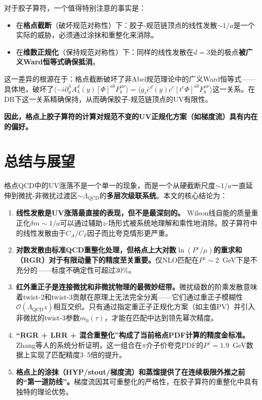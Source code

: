 \documentclass[12pt,a4paper]{ctexart}
\theoremstyle{definition}
\begin{document}
对于胶子算符，一个值得特别注意的事实是\cite{Li2018multiplicative}：

\begin{itemize}
    \item 在\textbf{格点截断}（破坏规范对称性）下：胶子-规范链顶点的线性发散$\sim 1/a$是一个实际的威胁，必须通过涂抹和重整化来消除。
    \item 在\textbf{维数正规化}（保持规范对称性）下：同样的线性发散在$d=3$处的极点\textbf{被广义Ward恒等式确保抵消}。
\end{itemize}

这一差异的根源在于：格点截断破坏了非Abel规范理论中的广义Ward恒等式——具体地，破坏了$\langle -i\partial_y^\lambda A_\lambda^d(y) [\Phi]^{ab} F^{\mu\nu}_b \rangle = \langle g_s \bar{c}^d(y) c^e [t^e\Phi]^{ab} F^{\mu\nu}_b \rangle$这一关系\cite{Li2018multiplicative}。在DR下这一关系精确保持，从而确保胶子-规范链顶点的UV有限性。

\textbf{因此，格点上胶子算符的计算对规范不变的UV正规化方案（如梯度流）具有内在的偏好。}

\section{总结与展望}

格点QCD中的UV涨落不是一个单一的现象，而是一个从硬截断尺度$\sim 1/a$一直延伸到微扰-非微扰过渡区$\sim \Lambda_{\text{QCD}}$的\textbf{多层次级联系统}。本文的核心结论为：

\begin{enumerate}
    \item \textbf{线性发散是UV涨落最直接的表现，但不是最深刻的。} Wilson线自能的质量重正化$\delta m \sim 1/a$可以通过辅助$z$-场形式\cite{Chen2016improved}被系统地理解和乘性地消除。胶子算符中的线性发散由于$C_A/C_F$因子而比夸克情形更严重。

    \item \textbf{对数发散由标准QCD重整化处理，但格点上大对数$\ln(P^z/\mu)$的重求和（RGR）对于有限动量下的精度至关重要。}仅NLO匹配在$P^z \sim 2$~GeV下是不充分的——标度不确定性可超过30\%\cite{Zhang2023RGR}。

    \item \textbf{红外重正子是连接微扰和非微扰物理的最微妙纽带。}微扰级数的阶乘发散意味着twist-2和twist-3贡献在原理上无法完全分离——它们通过重正子模糊性$\mathcal{O}(\Lambda_{\text{QCD}}z)$相互交织\cite{Su2023LRR,Braun2019power}。只有通过指定重正子正规化方案（如主值PV）并引入非微扰的twist-3参数$m_0(\tau)$，才能在匹配中达到领先幂次精度。

    \item \textbf{``RGR + LRR + 混合重整化''构成了当前格点PDF计算的精度金标准。}Zhang等人的系统分析\cite{Zhang2023RGR}证明，这一组合在$\pi$介子价夸克PDF的$P^z = 1.9$~GeV数据上实现了匹配精度3--5倍的提升。

    \item \textbf{格点上的涂抹（HYP/stout/梯度流）和蒸馏提供了在连续极限外推之前的``第一道防线''。}梯度流因其可重整化的严格性，在胶子算符的重整化中具有独特的理论优势\cite{NieMiera2025}。
\end{enumerate}
\end{document}
